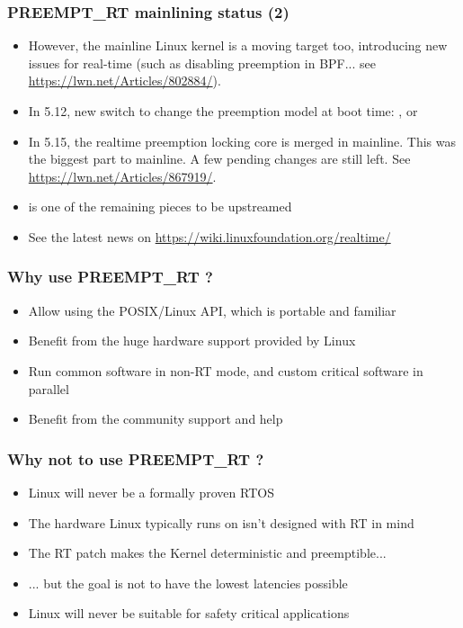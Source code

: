 \begin{frame}
  \frametitle{PREEMPT\_RT mainlining status (2)}
  \begin{itemize}
  \item However, the mainline Linux kernel is a moving target too,
        introducing new issues for real-time (such as disabling preemption in
        BPF... see \url{https://lwn.net/Articles/802884/}).
  \item In 5.12, new  switch to change the preemption
        model at boot time: ,  or
  \item In 5.15, the realtime preemption locking core is merged in mainline.
	This was the biggest part to mainline. A few pending changes are
	still left. See \url{https://lwn.net/Articles/867919/}.
  \item {} is one of the remaining pieces to be upstreamed
  \item See the latest news on \url{https://wiki.linuxfoundation.org/realtime/}
  \end{itemize}
\end{frame}

\begin{frame}
	\frametitle{Why use PREEMPT\_RT ?}
	\begin{itemize}
		\item Allow using the POSIX/Linux API, which is portable and familiar
		\item Benefit from the huge hardware support provided by Linux
		\item Run common software in non-RT mode, and custom critical software in parallel
		\item Benefit from the community support and help
	\end{itemize}
\end{frame}

\begin{frame}
	\frametitle{Why not to use PREEMPT\_RT ?}
	\begin{itemize}
		\item Linux will never be a formally proven RTOS
		\item The hardware Linux typically runs on isn't designed with RT in mind
		\item The RT patch makes the Kernel deterministic and preemptible...
		\item ... but the goal is not to have the lowest latencies possible
		\item Linux will never be suitable for safety critical applications
	\end{itemize}
\end{frame}

